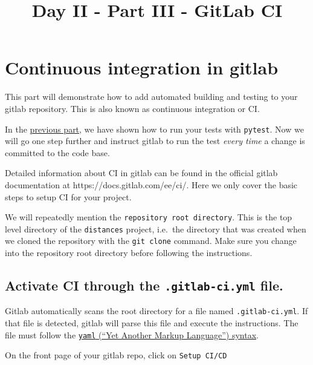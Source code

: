 \documentclass[11pt]{article}
\title{Day II - Part III - GitLab CI}
\begin{document}
    
    \maketitle
    
    

    
    \hypertarget{continuous-integration-in-gitlab}{%
\section{Continuous integration in
gitlab}\label{continuous-integration-in-gitlab}}

    This part will demonstrate how to add automated building and testing to
your gitlab repository. This is also known as continuous integration or
CI.

    In the
\href{https://gitlab.gwdg.de/glynatsi/rsd-workshop/-/blob/master/Day\%20II\%20-\%20Part\%20II\%20-\%20GitLab\%20exercise.ipynb}{previous
part}, we have shown how to run your tests with \texttt{pytest}. Now we
will go one step further and instruct gitlab to run the test \emph{every
time} a change is committed to the code base.

    Detailed information about CI in gitlab can be found in the official
gitlab documentation at https://docs.gitlab.com/ee/ci/. Here we only
cover the basic steps to setup CI for your project.

    We will repeatedly mention the \texttt{repository\ root\ directory}.
This is the top level directory of the \texttt{distances} project,
i.e.~the directory that was created when we cloned the repository with
the \texttt{git\ clone} command. Make sure you change into the
repository root directory before following the instructions.

    \hypertarget{activate-ci-through-the-.gitlab-ci.yml-file.}{%
\subsection{\texorpdfstring{Activate CI through the
\texttt{.gitlab-ci.yml}
file.}{Activate CI through the .gitlab-ci.yml file.}}\label{activate-ci-through-the-.gitlab-ci.yml-file.}}

Gitlab automatically scans the root directory for a file named
\texttt{.gitlab-ci.yml}. If that file is detected, gitlab will parse
this file and execute the instructions. The file must follow the
\href{https://yaml.org}{\texttt{yaml} (``Yet Another Markup Language'')
syntax}.

    On the front page of your gitlab repo, click on \texttt{Setup\ CI/CD}
\end{document}
